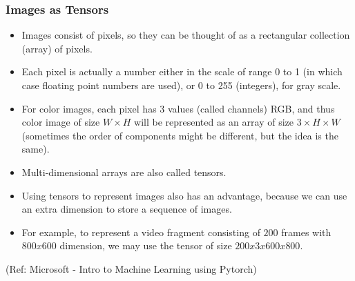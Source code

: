 \begin{frame}[fragile] \frametitle{Images as Tensors}


\begin{itemize}
\item Images consist of pixels, so they can be thought of as a rectangular collection (array) of pixels.
\item Each pixel is actually a number either in the scale of range 0 to 1 (in which case floating point numbers are used), or 0 to 255 (integers), for gray scale.
\item For color images, each pixel has 3 values (called channels) RGB, and thus color image of size  $W×H$  will be represented as an array of size $3×H×W$
  (sometimes the order of components might be different, but the idea is the same).
	\item Multi-dimensional arrays are also called tensors. 
	\item Using tensors to represent images also has an advantage, because we can use an extra dimension to store a sequence of images.
	\item For example, to represent a video fragment consisting of $200$ frames with $800x600$ dimension, we may use the tensor of size $200x3x600x800$.
\end{itemize}


\tiny{(Ref: Microsoft - Intro to Machine Learning using Pytorch)}
\end{frame}


